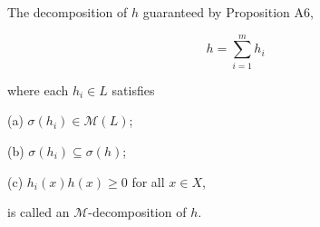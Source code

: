 The decomposition of $h$ guaranteed by Proposition A6,

$$h = \sum_{i=1}^{m} h_i$$

where each $h_i \in L$ satisfies

(a) $\sigma(h_i) \in \mathcal{M}(L)$;

(b) $\sigma(h_i) \subseteq \sigma(h)$;

(c) $h_i(x)h(x) \geq 0$ for all $x \in X$,

is called an $\mathcal{M}$-decomposition of $h$.
